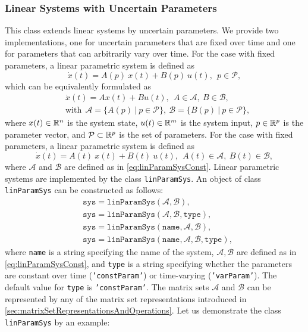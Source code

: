 \subsubsection{Linear Systems with Uncertain Parameters} \label{sec:linearParamSystems}

This class extends linear systems by uncertain parameters. We provide two implementations, one for uncertain parameters that are fixed over time and one for parameters that can arbitrarily vary over time. For the case with fixed parameters, a linear parametric system is defined as
\begin{equation*}
	\dot{x}(t) = A(p)~x(t) + B(p)~u(t), ~~ p \in \mathcal{P},
\end{equation*}
which can be equivalently formulated as
\begin{equation}
	\begin{split} \label{eq:linParamSysConst}
	& \dot{x}(t) = A x(t) + B u(t), ~~ A \in \mathcal{A},~B \in \mathcal{B}, \\
	& \text{with} ~~ \mathcal{A} = \{ A(p) ~|~ p \in \mathcal{P} \},~ \mathcal{B} = \{ B(p) ~|~ p \in \mathcal{P} \},
	\end{split}
\end{equation}
where $x(t) \in \mathbb{R}^n$ is the system state, $u(t)\in \mathbb{R}^m$ is the system input, $p \in \mathbb{R}^p$ is the parameter vector, and $\mathcal{P} \subset \mathbb{R}^p$ is the set of parameters. For the case with fixed parameters, a linear parametric system is defined as
\begin{equation*}
	\dot{x}(t) = A(t)~x(t) + B(t)~u(t), ~~ A(t) \in \mathcal{A},~B(t) \in \mathcal{B},
\end{equation*}	
where $\mathcal{A}$ and $\mathcal{B}$ are defined as in \eqref{eq:linParamSysConst}. Linear parametric systems are implemented by the class \texttt{linParamSys}. An object of class \texttt{linParamSys} can be constructed as follows:
\begin{equation*}
	\begin{split}
		& \texttt{sys} = \texttt{linParamSys}(\mathcal{A},\mathcal{B}), \\
		& \texttt{sys} = \texttt{linParamSys}(\mathcal{A},\mathcal{B},\texttt{type}), \\
		& \texttt{sys} = \texttt{linParamSys}(\texttt{name},\mathcal{A},\mathcal{B}), \\
		& \texttt{sys} = \texttt{linParamSys}(\texttt{name},\mathcal{A},\mathcal{B},\texttt{type}),
	\end{split}
\end{equation*} 
where \texttt{name} is a string specifying the name of the system, $\mathcal{A},\mathcal{B}$ are defined as in \eqref{eq:linParamSysConst}, and \texttt{type} is a string specifying whether the parameters are constant over time (\texttt{'constParam'}) or time-varying (\texttt{'varParam'}). The default value for \texttt{type} is \texttt{'constParam'}. The matrix sets $\mathcal{A}$ and $\mathcal{B}$ can be represented by any of the matrix set representations introduced in \cref{sec:matrixSetRepresentationsAndOperations}. Let us demonstrate the class \texttt{linParamSys} by an example:

